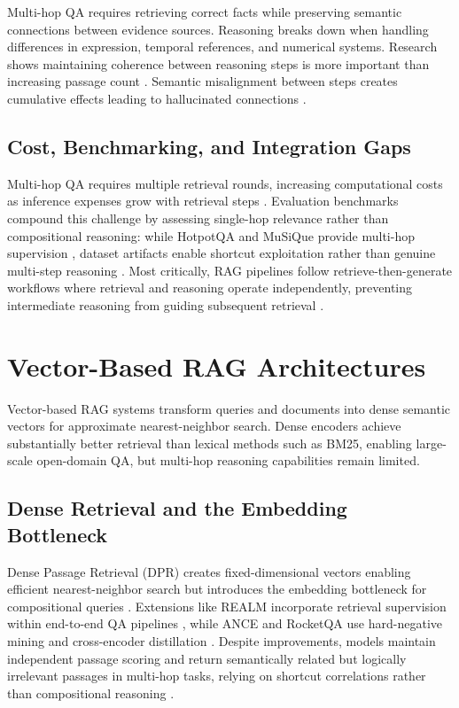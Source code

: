 \documentclass[runningheads]{llncs}
\begin{document}
Multi-hop QA requires retrieving correct facts while preserving semantic connections between evidence sources. Reasoning breaks down when handling differences in expression, temporal references, and numerical systems. Research shows maintaining coherence between reasoning steps is more important than increasing passage count \cite{22,23}. Semantic misalignment between steps creates cumulative effects leading to hallucinated connections \cite{24}.

\subsection{Cost, Benchmarking, and Integration Gaps}

Multi-hop QA requires multiple retrieval rounds, increasing computational costs as inference expenses grow with retrieval steps \cite{26}. Evaluation benchmarks compound this challenge by assessing single-hop relevance rather than compositional reasoning: while HotpotQA and MuSiQue provide multi-hop supervision \cite{28,29}, dataset artifacts enable shortcut exploitation rather than genuine multi-step reasoning \cite{30}. Most critically, RAG pipelines follow retrieve-then-generate workflows where retrieval and reasoning operate independently, preventing intermediate reasoning from guiding subsequent retrieval \cite{23,67}.


\section{Vector-Based RAG Architectures}

Vector-based RAG systems transform queries and documents into dense semantic vectors for approximate nearest-neighbor search. Dense encoders \cite{31,32} achieve substantially better retrieval than lexical methods such as BM25, enabling large-scale open-domain QA, but multi-hop reasoning capabilities remain limited.

\subsection{Dense Retrieval and the Embedding Bottleneck}

Dense Passage Retrieval (DPR) creates fixed-dimensional vectors enabling efficient nearest-neighbor search but introduces the embedding bottleneck for compositional queries \cite{7}. Extensions like REALM incorporate retrieval supervision within end-to-end QA pipelines \cite{2,35}, while ANCE and RocketQA use hard-negative mining and cross-encoder distillation \cite{36,43}. Despite improvements, models maintain independent passage scoring and return semantically related but logically irrelevant passages in multi-hop tasks, relying on shortcut correlations rather than compositional reasoning \cite{38,47}.
\end{document}
